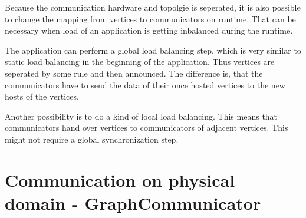Because the communication hardware and topolgie is seperated,
it is also possible to change the mapping from vertices to 
communicators on runtime. That can be necessary when load
of an application is getting inbalanced during the runtime.

The application can perform a global load balancing step, which
is very similar to static load balancing in the beginning
of the application. Thus vertices are seperated by some rule
and then announced. The difference is, that the communicators
have to send the data of their once hosted vertices to the
new hosts of the vertices.

Another possibility is to do a kind of local load balancing.
This means that communicators hand over vertices to communicators
of adjacent vertices. This might not require a global synchronization
step.







\begin{itemize}

\end{itemize}

\section{Communication on physical domain - GraphCommunicator}

